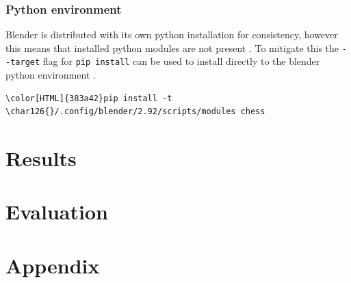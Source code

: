 \documentclass[11pt]{article}
\begin{document}
\subsubsection{Python environment}
\label{sec:org092b555}
Blender is distributed with its own python installation for consistency,
however this means that installed python modules are not present
\cite{blender-python-env}. To mitigate this the \texttt{-{}-target} flag for \texttt{pip install}
can be used to install directly to the blender python environment
\cite{pip-install-man}.
\begin{Code}
\begin{Verbatim}[]
\color[HTML]{383a42}pip install -t \char126{}/.config/blender/2.92/scripts/modules chess
\end{Verbatim}
\end{Code}

\section{Results}
\label{sec:org651a5cd}
\section{Evaluation}
\label{sec:orgaa4e938}

\newpage
\section{Appendix}
\label{sec:orgd0a78ad}
\newpage
\printbibliography
\end{document}
